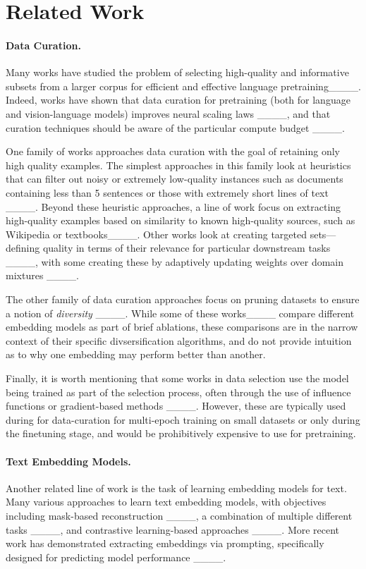 \section{Related Work}
\paragraph{Data Curation.} Many works have studied the problem of selecting high-quality and informative subsets from a larger corpus for efficient and effective language pretraining____. Indeed, works have shown that data curation for pretraining (both for language and vision-language models) improves neural scaling laws ____, and that curation techniques should be aware of the particular compute budget ____.

One family of works approaches data curation with the goal of retaining only high quality examples. The simplest approaches in this family look at heuristics that can filter out noisy or extremely low-quality instances such as documents containing less than 5 sentences or those with extremely short lines of text ____. Beyond these heuristic approaches, a line of work focus on extracting high-quality examples based on similarity to known high-quality sources, such as Wikipedia or textbooks____. 
Other works look at creating targeted sets---defining quality in terms of their relevance for particular downstream tasks ____, with some creating these by adaptively updating weights over domain mixtures ____. 

The other family of data curation approaches focus on pruning datasets to ensure a notion of \textit{diversity} ____. While some of these works____ compare different embedding models as part of brief ablations, these comparisons are in the narrow context of their specific divsersification algorithms, and do not provide intuition as to why one embedding may perform better than another. 

Finally, it is worth mentioning that some works in data selection use the model being trained as part of the selection process, often through the use of influence functions or gradient-based methods ____. 
However, these are typically used during for data-curation for multi-epoch training on small datasets or only during the finetuning stage, and would be prohibitively expensive to use for pretraining.


\paragraph{Text Embedding Models.} Another related line of work is the task of learning embedding models for text. 
Many various approaches to learn text embedding models, with objectives including mask-based reconstruction ____, a combination of multiple different tasks ____, and contrastive learning-based approaches ____.
More recent work has demonstrated extracting embeddings via prompting, specifically designed for predicting model performance ____.

